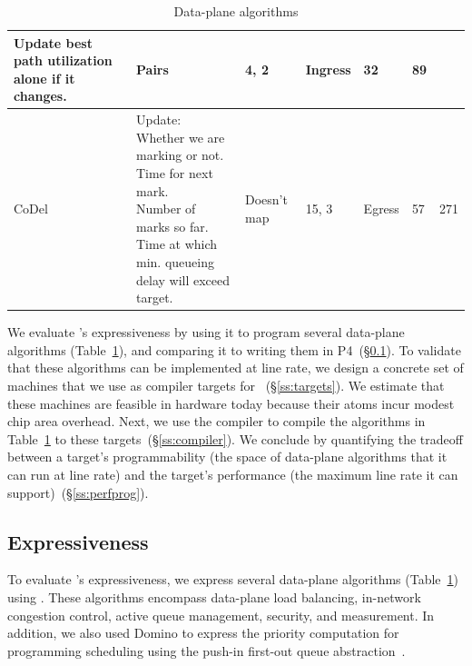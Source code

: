 \begin{table}[!t]
\begin{tabular}{|p{}|p{}|p{}|p{}|p{}|p{}|p{}|}
{                                           Update best path utilization alone if it changes.}  & Pairs & 4, 2 & Ingress & 32 & 89\\
\hline
CoDel~\cite{codel} & \pbox{0.34\textwidth}{Update:\\Whether we are marking or not.\\Time for next mark.\\Number of marks so far.\\Time at which min. queueing delay will exceed target.}& Doesn't map & 15, 3 & Egress & 57 & 271\\
\hline
\end{tabular}
\caption{Data-plane algorithms}
\label{tab:algos}
\end{table}

We evaluate \pktlanguage's expressiveness by using it to program several
data-plane algorithms (Table~\ref{tab:algos}), and comparing it to writing them
in P4~(\S\ref{ss:expressiveness}).  To validate that these algorithms can be
implemented at line rate, we design a concrete set of \absmachine machines that
we use as compiler targets for \pktlanguage~(\S\ref{ss:targets}).  We estimate
that these machines are feasible in hardware today because their atoms incur
modest chip area overhead. Next, we use the \pktlanguage compiler to compile
the algorithms in Table~\ref{tab:algos} to these targets~(\S\ref{ss:compiler}).
We conclude by quantifying the tradeoff between a target's programmability (the
space of data-plane algorithms that it can run at line rate) and the target's
performance (the maximum line rate it can support)~(\S\ref{ss:perfprog}).

\subsection{Expressiveness}
\label{ss:expressiveness}

To evaluate \pktlanguage's expressiveness, we express several data-plane
algorithms (Table~\ref{tab:algos}) using \pktlanguage. These algorithms
encompass data-plane load balancing, in-network congestion control, active
queue management, security, and measurement. In addition, we also used Domino
to express the priority computation for programming scheduling using the
push-in first-out queue abstraction~\cite{pifo_hotnets}.

